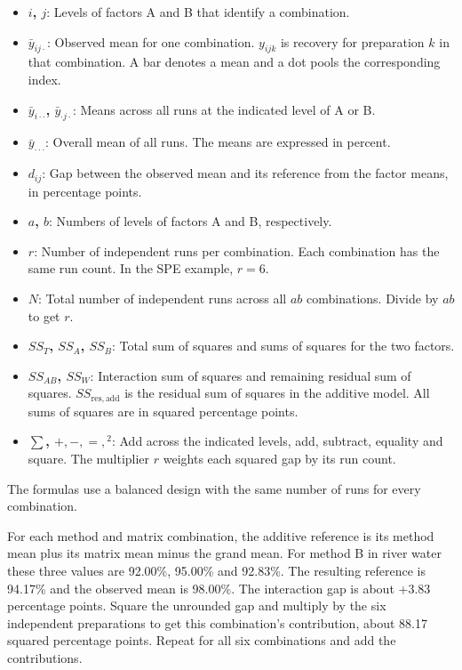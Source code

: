 \documentclass[11pt,a4paper]{article}
\begin{document}
\begin{minipage}{\linewidth}
\begin{itemize}\setlength{\itemsep}{1pt}\setlength{\parsep}{0pt}
\item \textbf{\(i\), \(j\)}: Levels of factors A and B that identify a combination.
\item \textbf{\(\bar y_{ij\cdot}\)}: Observed mean for one combination. \(y_{ijk}\) is recovery for preparation \(k\) in that combination. A bar denotes a mean and a dot pools the corresponding index.
\item \textbf{\(\bar y_{i\cdot\cdot}\), \(\bar y_{\cdot j\cdot}\)}: Means across all runs at the indicated level of A or B.
\item \textbf{\(\bar y_{\cdot\cdot\cdot}\)}: Overall mean of all runs. The means are expressed in percent.
\item \textbf{\(d_{ij}\)}: Gap between the observed mean and its reference from the factor means, in percentage points.
\item \textbf{\(a\), \(b\)}: Numbers of levels of factors A and B, respectively.
\item \textbf{\(r\)}: Number of independent runs per combination. Each combination has the same run count. In the SPE example, \(r=6\).
\item \textbf{\(N\)}: Total number of independent runs across all \(ab\) combinations. Divide by \(ab\) to get \(r\).
\item \textbf{\(SS_T\), \(SS_A\), \(SS_B\)}: Total sum of squares and sums of squares for the two factors.
\item \textbf{\(SS_{AB}\), \(SS_W\)}: Interaction sum of squares and remaining residual sum of squares. \(SS_{\mathrm{res,add}}\) is the residual sum of squares in the additive model. All sums of squares are in squared percentage points.
\item \textbf{\(\sum\), \(+,-,=,{}^2\)}: Add across the indicated levels, add, subtract, equality and square. The multiplier \(r\) weights each squared gap by its run count.
\end{itemize}

The formulas use a balanced design with the same number of runs for every combination.

\end{minipage}\par
\medskip

For each method and matrix combination, the additive reference is its method mean plus its matrix mean minus the grand mean. For method B in river water these three values are 92.00\%, 95.00\% and 92.83\%. The resulting reference is 94.17\% and the observed mean is 98.00\%. The interaction gap is about +3.83 percentage points. Square the unrounded gap and multiply by the six independent preparations to get this combination’s contribution, about 88.17 squared percentage points. Repeat for all six combinations and add the contributions.
\end{document}
